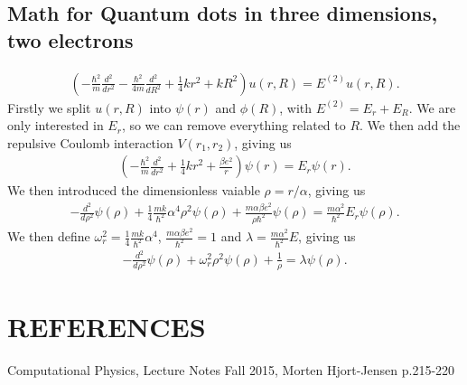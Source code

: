 \documentclass[a4paper]{article}
\begin{document}
\subsection{Math for Quantum dots in three dimensions, two electrons}\label{opp e math}
\begin{align}
\left(  -\frac{\hbar^2}{m} \frac{d^2}{dr^2} -\frac{\hbar^2}{4 m} \frac{d^2}{dR^2}+ \frac{1}{4} k r^2+  kR^2\right)u(r,R)  = E^{(2)} u(r,R).
\end{align}
Firstly we split $u(r,R)$ into  $\psi(r)$ and $\phi(R)$, with $E^{(2)} = E_r + E_R$. We are only interested in $E_r$, so we can remove everything related to $R$. We then add the repulsive Coulomb interaction $V(r_1,r_2)$, giving us
\begin{align}
\left(  -\frac{\hbar^2}{m} \frac{d^2}{dr^2}+ \frac{1}{4}k r^2+\frac{\beta e^2}{r}\right)\psi(r)  = E_r \psi(r).
\end{align}
We then introduced the dimensionless vaiable $\rho = r/\alpha$, giving us
\begin{align}
  -\frac{d^2}{d\rho^2} \psi(\rho) 
+ \frac{1}{4}\frac{mk}{\hbar^2} \alpha^4\rho^2\psi(\rho)+\frac{m\alpha \beta e^2}{\rho\hbar^2}\psi(\rho)  = 
\frac{m\alpha^2}{\hbar^2}E_r \psi(\rho) .
\end{align}
We then define $\omega_r^2=\frac{1}{4}\frac{mk}{\hbar^2} \alpha^4$, $\frac{m\alpha \beta e^2}{\hbar^2}=1$ and $\lambda = \frac{m\alpha^2}{\hbar^2}E$, giving us
\begin{align}
  -\frac{d^2}{d\rho^2} \psi(\rho) + \omega_r^2\rho^2\psi(\rho) +\frac{1}{\rho} = \lambda \psi(\rho).
\end{align}


\section{REFERENCES}
\begin{thebibliography}{9}
	Computational Physics, Lecture Notes Fall 2015, Morten Hjort-Jensen p.215-220
\end{thebibliography}




\end{document}
